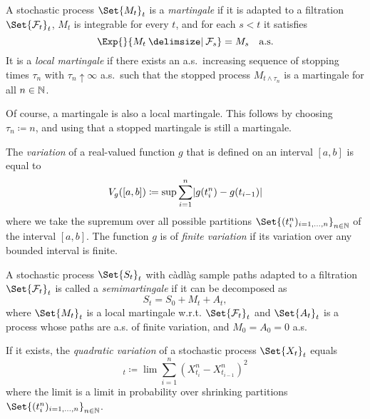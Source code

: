 \begin{definition}
  A stochastic process \(\Set{M_t}_{t}\) is a \textit{martingale} if it is adapted to a filtration \(\Set{\cF_t}_t\), \( M_t \) is integrable for every \(t\), and for each \( s < t \) it satisfies
  \begin{equation}
    \Exp{}{M_t \given \cF_s} = M_s \quad \text{a.s.}
  \end{equation}
  It is a \textit{local martingale} if there exists an a.s.\ increasing sequence of stopping times \( \tau_n \) with \( \tau_n \uparrow \infty \) a.s.\ such that the stopped process \( M_{t \land \tau_n} \) is a martingale for all \( n \in \mathbb{N} \). %
\end{definition}

Of course, a martingale is also a local martingale.
This follows by choosing \( \tau_n \coloneqq n \), and using that a stopped martingale is still a martingale.

\begin{definition}
  The \textit{variation} of a real-valued function \( g \) that is defined on an interval \( [a,b] \) is equal to
  \begin{equation}
    V_g([a,b]) \coloneqq \sup \sum_{i=1}^n \lvert g(t_i^n) - g(t_{i-1}) \rvert
  \end{equation}
  where we take the supremum over all possible partitions \(\Set{(t_i^n)_{i=1,\dots,n}}_{n\in\bN}\) of the interval \( [a,b] \).
  The function \( g \) is of \textit{finite variation} if its variation over any bounded interval is finite.
\end{definition}

\begin{definition}
  A stochastic process \(\Set{S_t}_{t}\) with càdlàg sample paths adapted to a filtration \(\Set{\cF_t}_t\) is called a \textit{semimartingale} if it can be decomposed as
  \begin{equation}
    S_t = S_0 + M_t + A_t,
  \end{equation}
  where \( \Set{M_t}_{t} \) is a local martingale w.r.t. \(\Set{\cF_t}_t\) and \( \Set{A_t}_{t} \) is a process whose paths are a.s. of finite variation, and \( M_0 = A_0 = 0 \) a.s.
\end{definition}

\begin{definition}
  If it exists, the \textit{quadratic variation} of a stochastic process \(\Set{X_t}_{t}\) equals
  \begin{equation}
    [X]_t \coloneqq \lim \sum_{i=1}^n (X_{t_i}^n - X_{t_{i-1}}^n)^2
  \end{equation}
  where the limit is a limit in probability over shrinking partitions \(\Set{(t_i^n)_{i=1,\dots,n}}_{n\in\bN}\).
\end{definition}

